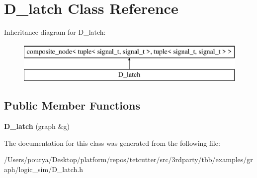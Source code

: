 \hypertarget{classD__latch}{}\section{D\+\_\+latch Class Reference}
\label{classD__latch}
Inheritance diagram for D\+\_\+latch\+:\begin{figure}[H]
\begin{center}
\leavevmode
\includegraphics[height=2.000000cm]{classD__latch}
\end{center}
\end{figure}
\subsection*{Public Member Functions}
\begin{DoxyCompactItemize}
\item 
\hypertarget{classD__latch_ac96e0ebcc61fd36409b93ddfa30ff7e0}{}{\bfseries D\+\_\+latch} (graph \&g)\label{classD__latch_ac96e0ebcc61fd36409b93ddfa30ff7e0}

\end{DoxyCompactItemize}


The documentation for this class was generated from the following file\+:\begin{DoxyCompactItemize}
\item 
/\+Users/pourya/\+Desktop/platform/repos/tetcutter/src/3rdparty/tbb/examples/graph/logic\+\_\+sim/D\+\_\+latch.\+h\end{DoxyCompactItemize}
